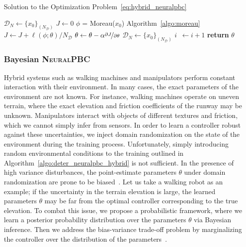 \begin{algorithm}
    \caption{Solution to the Optimization Problem~\eqref{eq:hybrid_neuralpbc}}
    \label{algo:deter_neuralpbc_hybrid}
    \small
    \begin{algorithmic}[1]
        \algrenewcommand\algorithmicindent{0em} %
        \State $\mathcal{D}_N \gets \{x_0\}_{(N_{\mathcal{D}})}$   
        \algrenewcommand\algorithmicindent{1.1em} %
        \State $J \gets 0$
            \State $\phi$ = Moreau($x_0$) \Comment Algorithm~\eqref{algo:moreau}
            \State $J \gets J + \ell(\phi; \theta)/N_{\mathcal{D}}$ 
        \EndFor
        \State $\theta \gets \theta - \alpha \nicefrac{\partial J}{\partial \theta}$
        \State $\mathcal{D}_N \gets \{x_0\}_{(N_{\mathcal{D}})}$
        \State $i \;\:\gets i + 1$
        \EndWhile
        \State \textbf{return} $\theta$
    \end{algorithmic}
\end{algorithm}

\subsubsection{Bayesian \textsc{NeuralPBC}}
\label{sssec:bayesian_inference}

Hybrid systems such as walking machines and manipulators perform constant
interaction with their environment. In many cases, the exact parameters of the
environment are not known. For instance, walking machines operate on uneven
terrain, where the exact elevation and friction coefficients of the runway may
be unknown. Manipulators interact with objects of different textures and
friction, which we cannot simply infer from sensors. 
%
In order to learn a controller robust against these uncertainties, we inject
domain randomization on the state of the environment during the training
process.
%
Unfortunately, simply introducing random environmental conditions to the
training outlined in Algorithm~\ref{algo:deter_neuralpbc_hybrid} is not sufficient. 
%
In the presence of high variance disturbances, the point-estimate parameters
$\theta$ under domain randomization are prone to be
biased~\cite{ashenafi2022robustness}.
%
Let us take a walking robot as an example; if the uncertainty in the terrain
elevation is large, the learned parameters $\theta$ may be far from the optimal
controller corresponding to the true elevation.
%
To combat this issue, we propose a probabilistic framework, where we learn a
posterior probability distribution over the parameters $\theta$ via Bayesian
inference. 
%
Then we address the bias-variance trade-off problem by marginalizing the
controller over the distribution of the parameters~\cite{bishop2006pattern}.

